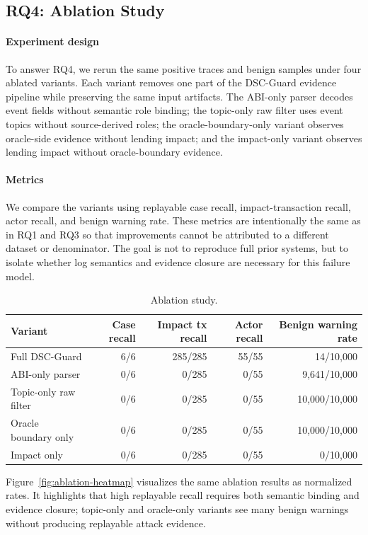 \documentclass[final,5p]{elsarticle}
\newcommand{\tool}{DSC-Guard\xspace}
\begin{document}
\subsection{RQ4: Ablation Study}

\paragraph{Experiment design}
To answer RQ4, we rerun the same positive traces and benign samples under four ablated variants.
Each variant removes one part of the DSC-Guard evidence pipeline while preserving the same input artifacts.
The ABI-only parser decodes event fields without semantic role binding; the topic-only raw filter uses event topics without source-derived roles; the oracle-boundary-only variant observes oracle-side evidence without lending impact; and the impact-only variant observes lending impact without oracle-boundary evidence.

\paragraph{Metrics}
We compare the variants using replayable case recall, impact-transaction recall, actor recall, and benign warning rate.
These metrics are intentionally the same as in RQ1 and RQ3 so that improvements cannot be attributed to a different dataset or denominator.
The goal is not to reproduce full prior systems, but to isolate whether log semantics and evidence closure are necessary for this failure model.

\begin{table}[t]
\centering
\caption{Ablation study.}
\label{tab:ablation}
\small
\begin{tabular}{lrrrr}
\toprule
Variant & Case recall & Impact tx recall & Actor recall & Benign warning rate \\
\midrule
Full \tool & 6/6 & 285/285 & 55/55 & 14/10,000 \\
ABI-only parser & 0/6 & 0/285 & 0/55 & 9,641/10,000 \\
Topic-only raw filter & 0/6 & 0/285 & 0/55 & 10,000/10,000 \\
Oracle boundary only & 0/6 & 0/285 & 0/55 & 10,000/10,000 \\
Impact only & 0/6 & 0/285 & 0/55 & 0/10,000 \\
\bottomrule
\end{tabular}
\end{table}

Figure~\ref{fig:ablation-heatmap} visualizes the same ablation results as normalized rates.
It highlights that high replayable recall requires both semantic binding and evidence closure; topic-only and oracle-only variants see many benign warnings without producing replayable attack evidence.
\end{document}
